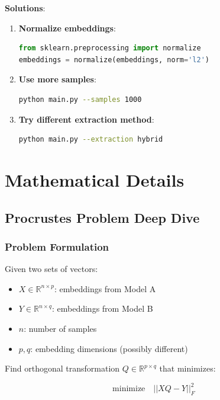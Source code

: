\documentclass[12pt,a4paper,oneside]{report}
\begin{document}
\textbf{Solutions}:

\begin{enumerate}
    \item \textbf{Normalize embeddings}:
    \begin{lstlisting}[language=Python]
from sklearn.preprocessing import normalize
embeddings = normalize(embeddings, norm='l2')
    \end{lstlisting}

    \item \textbf{Use more samples}:
    \begin{lstlisting}[language=Bash]
python main.py --samples 1000
    \end{lstlisting}

    \item \textbf{Try different extraction method}:
    \begin{lstlisting}[language=Bash]
python main.py --extraction hybrid
    \end{lstlisting}
\end{enumerate}

\chapter{Mathematical Details}

\section{Procrustes Problem Deep Dive}

\subsection{Problem Formulation}

Given two sets of vectors:
\begin{itemize}
    \item $X \in \mathbb{R}^{n \times p}$: embeddings from Model A
    \item $Y \in \mathbb{R}^{n \times q}$: embeddings from Model B
    \item $n$: number of samples
    \item $p, q$: embedding dimensions (possibly different)
\end{itemize}

Find orthogonal transformation $Q \in \mathbb{R}^{p \times q}$ that minimizes:

\begin{equation}
\text{minimize} \quad ||XQ - Y||_F^2
\end{equation}
\end{document}

